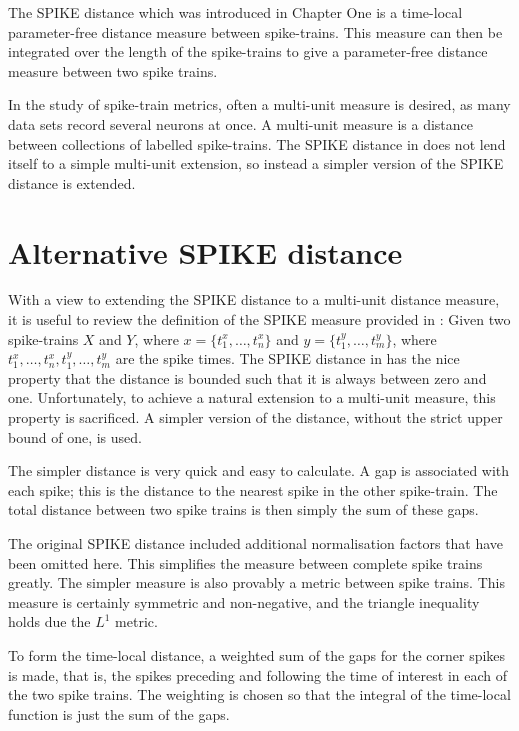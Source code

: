 The SPIKE distance \citep{KreuzEtAl2011a,KreuzEtAl2012a} which was introduced in Chapter One is a time-local parameter-free distance measure between spike-trains.  This measure can then be integrated over the length of the spike-trains to give a parameter-free distance measure between two spike trains.  

In the study of spike-train metrics, often a multi-unit measure is desired, as many data sets record several neurons at once.  A multi-unit measure is a distance between collections of labelled spike-trains.  The SPIKE distance in \citep{KreuzEtAl2011a} does not lend itself to a simple multi-unit extension, so instead a simpler version of the SPIKE distance is extended.

\section{Alternative SPIKE distance}
With a view to extending the SPIKE distance to a multi-unit distance measure, it is useful to review the definition of the SPIKE measure provided in \citep{KreuzEtAl2011a}:  Given two spike-trains $X$ and $Y$, where $x = \{ t_1^x, \ldots, t_n^x \}$ and $y = \{ t_1^y, \ldots , t_m^y\}$, where $t_1^x,\ldots,t_n^x,t_1^y,\ldots,t_m^y$ are the spike times.  The SPIKE distance in \citep{KreuzEtAl2011a} has the nice property that the distance is bounded such that it is always between zero and one.  Unfortunately, to achieve a natural extension to a multi-unit measure, this property is sacrificed.  A simpler version of the distance, without the strict upper bound of one, is used.

The simpler distance is very quick and easy to calculate.  A gap is associated with each spike; this is the distance to the nearest spike in the other spike-train.  The total distance between two spike trains is then simply the sum of these gaps.  

The original SPIKE distance included additional normalisation factors that have been omitted here. This simplifies the measure between complete spike trains greatly. The simpler measure is also provably a metric between spike trains. This measure is certainly symmetric and non-negative, and the triangle inequality holds due the $L^1$ metric.

To form the time-local distance, a weighted sum of the gaps for the corner spikes is made, that is, the spikes preceding and following the time of interest in each of the two spike trains.  The weighting is chosen so that the integral of the time-local function is just the sum of the gaps.

